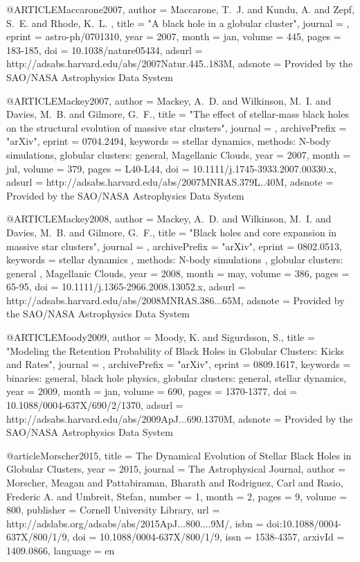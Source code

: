\documentclass[twocolumn,tighten]{aastex63}
\begin{document}
{{{{{@ARTICLE{Maccarone2007,
   author = {{Maccarone}, T.~J. and {Kundu}, A. and {Zepf}, S.~E. and {Rhode}, K.~L.
	},
    title = "{A black hole in a globular cluster}",
  journal = {\nat},
   eprint = {astro-ph/0701310},
     year = 2007,
    month = jan,
   volume = 445,
    pages = {183-185},
      doi = {10.1038/nature05434},
   adsurl = {http://adsabs.harvard.edu/abs/2007Natur.445..183M},
  adsnote = {Provided by the SAO/NASA Astrophysics Data System}
}

@ARTICLE{Mackey2007,
   author = {{Mackey}, A.~D. and {Wilkinson}, M.~I. and {Davies}, M.~B. and 
	{Gilmore}, G.~F.},
    title = "{The effect of stellar-mass black holes on the structural evolution of massive star clusters}",
  journal = {\mnras},
archivePrefix = "arXiv",
   eprint = {0704.2494},
 keywords = {stellar dynamics, methods: N-body simulations, globular clusters: general, Magellanic Clouds},
     year = 2007,
    month = jul,
   volume = 379,
    pages = {L40-L44},
      doi = {10.1111/j.1745-3933.2007.00330.x},
   adsurl = {http://adsabs.harvard.edu/abs/2007MNRAS.379L..40M},
  adsnote = {Provided by the SAO/NASA Astrophysics Data System}
}

@ARTICLE{Mackey2008,
   author = {{Mackey}, A.~D. and {Wilkinson}, M.~I. and {Davies}, M.~B. and 
	{Gilmore}, G.~F.},
    title = "{Black holes and core expansion in massive star clusters}",
  journal = {\mnras},
archivePrefix = "arXiv",
   eprint = {0802.0513},
 keywords = {stellar dynamics , methods: N-body simulations , globular clusters: general , Magellanic Clouds},
     year = 2008,
    month = may,
   volume = 386,
    pages = {65-95},
      doi = {10.1111/j.1365-2966.2008.13052.x},
   adsurl = {http://adsabs.harvard.edu/abs/2008MNRAS.386...65M},
  adsnote = {Provided by the SAO/NASA Astrophysics Data System}
}

@ARTICLE{Moody2009,
   author = {{Moody}, K. and {Sigurdsson}, S.},
    title = "{Modeling the Retention Probability of Black Holes in Globular Clusters: Kicks and Rates}",
  journal = {\apj},
archivePrefix = "arXiv",
   eprint = {0809.1617},
 keywords = {binaries: general, black hole physics, globular clusters: general, stellar dynamics},
     year = 2009,
    month = jan,
   volume = 690,
    pages = {1370-1377},
      doi = {10.1088/0004-637X/690/2/1370},
   adsurl = {http://adsabs.harvard.edu/abs/2009ApJ...690.1370M},
  adsnote = {Provided by the SAO/NASA Astrophysics Data System}
}

@article{Morscher2015,
    title = {{The Dynamical Evolution of Stellar Black Holes in Globular Clusters}},
    year = {2015},
    journal = {The Astrophysical Journal},
    author = {Morscher, Meagan and Pattabiraman, Bharath and Rodriguez, Carl and Rasio, Frederic A. and Umbreit, Stefan},
    number = {1},
    month = {2},
    pages = {9},
    volume = {800},
    publisher = {Cornell University Library},
    url = {http://adslabs.org/adsabs/abs/2015ApJ...800....9M/},
    isbn = {doi:10.1088/0004-637X/800/1/9},
    doi = {10.1088/0004-637X/800/1/9},
    issn = {1538-4357},
    arxivId = {1409.0866},
    language = {en}
}

}}}}}
\end{document}
